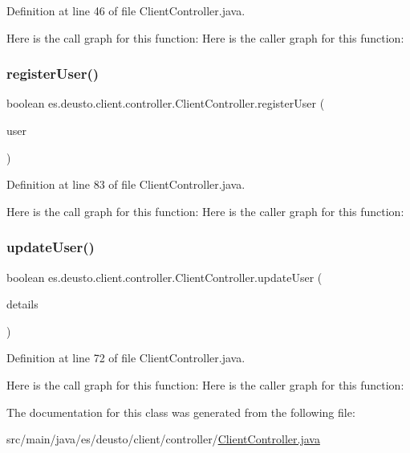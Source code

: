 Definition at line 46 of file Client\+Controller.\+java.

Here is the call graph for this function\+:
Here is the caller graph for this function\+:
\mbox{\label{classes_1_1deusto_1_1client_1_1controller_1_1_client_controller_a8f77e4957f536e48d7012d643d2c6cb8}} 
\subsubsection{\texorpdfstring{registerUser()}{registerUser()}}
{\footnotesize\ttfamily boolean es.\+deusto.\+client.\+controller.\+Client\+Controller.\+register\+User (\begin{DoxyParamCaption}\item[{\mbox{\hyperlink{classes_1_1deusto_1_1server_1_1data_1_1_user_details_d_t_o}{User\+Details\+D\+TO}}}]{user }\end{DoxyParamCaption})}



Definition at line 83 of file Client\+Controller.\+java.

Here is the call graph for this function\+:
Here is the caller graph for this function\+:
\mbox{\label{classes_1_1deusto_1_1client_1_1controller_1_1_client_controller_ad1a2384c7c7f73d40d8d50c4bf77be7d}} 
\subsubsection{\texorpdfstring{updateUser()}{updateUser()}}
{\footnotesize\ttfamily boolean es.\+deusto.\+client.\+controller.\+Client\+Controller.\+update\+User (\begin{DoxyParamCaption}\item[{\mbox{\hyperlink{classes_1_1deusto_1_1server_1_1data_1_1_user_details_d_t_o}{User\+Details\+D\+TO}}}]{details }\end{DoxyParamCaption})}



Definition at line 72 of file Client\+Controller.\+java.

Here is the call graph for this function\+:
Here is the caller graph for this function\+:


The documentation for this class was generated from the following file\+:\begin{DoxyCompactItemize}
\item 
src/main/java/es/deusto/client/controller/\mbox{\hyperlink{_client_controller_8java}{Client\+Controller.\+java}}\end{DoxyCompactItemize}
